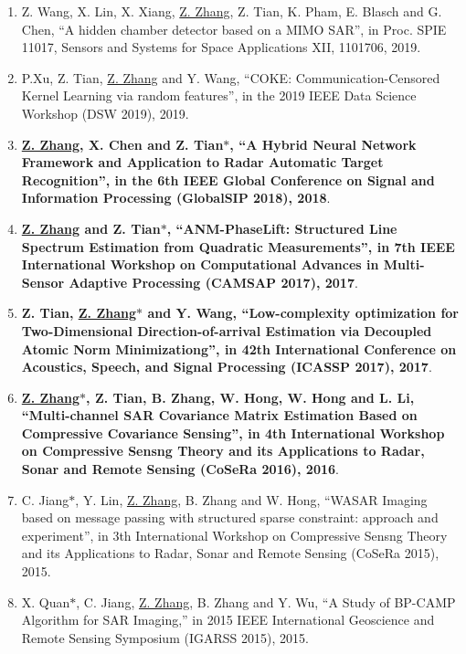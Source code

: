 \documentclass[paper=a4,fontsize=11pt]{scrartcl}
\begin{document}
\begin{enumerate}
	\item {Z. Wang, X. Lin, X. Xiang, \underline{Z. Zhang}, Z. Tian, K. Pham, E. Blasch and G. Chen, ``A hidden chamber detector based on a MIMO SAR'', in Proc. SPIE 11017, Sensors and Systems for Space Applications XII, 1101706, 2019}.
	
	\item {P.Xu, Z. Tian, \underline{Z. Zhang} and Y. Wang, ``COKE: Communication-Censored Kernel Learning via random features'', in the 2019 IEEE Data Science Workshop (DSW 2019), 2019}.
	
	\item \textbf{\underline{Z. Zhang}, X. Chen and Z. Tian$\ast$, ``A Hybrid Neural Network Framework and Application to Radar Automatic Target Recognition'', in the 6th IEEE Global Conference on Signal and Information Processing (GlobalSIP 2018), 2018}.
	
	\item \textbf{\underline{Z. Zhang} and Z. Tian$\ast$, ``ANM-PhaseLift: Structured Line Spectrum Estimation from Quadratic Measurements'', in 7th IEEE International Workshop on Computational Advances in Multi-Sensor Adaptive Processing (CAMSAP 2017), 2017}.
	
	\item \textbf{Z. Tian, \underline{Z. Zhang$\ast$} and Y. Wang, ``Low-complexity optimization for Two-Dimensional Direction-of-arrival Estimation via Decoupled Atomic Norm Minimizationg'', in 42th International Conference on Acoustics, Speech, and Signal Processing (ICASSP 2017), 2017}.
	
	\item \textbf{\underline{Z. Zhang$\ast$}, Z. Tian, B. Zhang, W. Hong, W. Hong and L. Li, ``Multi-channel SAR Covariance Matrix Estimation Based on Compressive Covariance Sensing'', in 4th International Workshop on Compressive Sensng Theory and its Applications to Radar, Sonar and Remote Sensing (CoSeRa 2016), 2016}.
	
	\item C. Jiang$\ast$, Y. Lin, \underline{Z. Zhang}, B. Zhang and W. Hong, ``WASAR Imaging based on message passing with structured sparse constraint: approach and experiment'', in 3th International Workshop on Compressive Sensng Theory and its Applications to Radar, Sonar and Remote Sensing (CoSeRa 2015), 2015.
	
	\item X. Quan$\ast$, C. Jiang, \underline{Z. Zhang}, B. Zhang and Y. Wu, ``A Study of BP-CAMP Algorithm for SAR Imaging,'' in 2015 IEEE International Geoscience and Remote Sensing Symposium (IGARSS 2015), 2015.
	

\end{enumerate}
\end{document}
